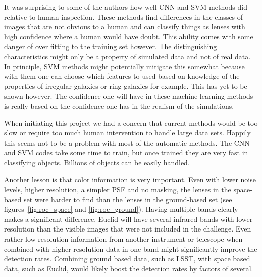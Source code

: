 \documentclass[useAMS,usenatbib]{mnras}
\begin{document}
It was surprising to some of the authors how well CNN and SVM methods did relative to human inspection.  These methods find differences in the classes of images that are not obvious to a human and can classify things as lenses with high confidence where a human would have doubt. 
This ability comes with some danger of over fitting to the training set however.  The distinguishing characteristics might only be a property of simulated data and not of real data.  In principle, SVM methods might potentially mitigate this somewhat because with them one can choose which features to used based on knowledge of the properties of irregular galaxies or ring galaxies for example.  This has yet to be shown however.
The confidence one will have in these machine learning methods is really based on the confidence one has in the realism of the simulations.   

When initiating this project we had a concern that current methods would be too slow or require too much human intervention to handle large data sets.  Happily this seems not to be a problem with most of the automatic methods.  The CNN and SVM codes take some time to train, but once trained they are very fast in classifying objects.  Billions of objects can be easily handled.

Another lesson is that color information is very important.  Even with lower noise levels, higher resolution, a simpler PSF and no masking, the lenses in the space-based set were harder to find than the lenses in the ground-based set (see figures~\ref{fig:roc_space} and \ref{fig:roc_ground}).  Having multiple bands clearly makes a significant difference.  Euclid will have several infrared bands with lower resolution than the visible images that were not included in the challenge.  Even rather low resolution information from another instrument or telescope when combined with higher resolution data in one band might significantly improve the detection rates.  Combining ground based data, such as LSST, with space based data, such as Euclid, would likely boost the detection rates by factors of several.
\end{document}
